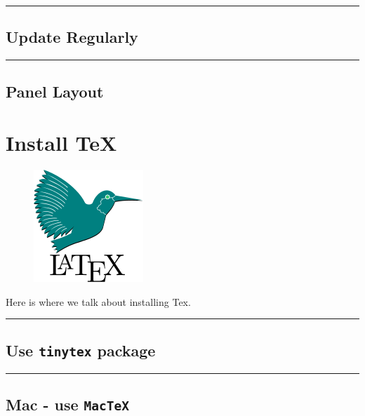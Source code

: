 \documentclass[]{book}
\theoremstyle{definition}
\theoremstyle{definition}
\theoremstyle{definition}
\theoremstyle{remark}
\begin{document}
\begin{center}\rule{0.5\linewidth}{\linethickness}\end{center}

\section{Update Regularly}\label{update-regularly-1}

\begin{center}\rule{0.5\linewidth}{\linethickness}\end{center}

\section{Panel Layout}\label{panel-layout}

\chapter{Install TeX}\label{install-tex}

\begin{figure}
\centering
\includegraphics{img/latex.png}
\caption{}
\end{figure}

Here is where we talk about installing Tex.

\begin{center}\rule{0.5\linewidth}{\linethickness}\end{center}

\section{\texorpdfstring{Use \texttt{tinytex}
package}{Use tinytex package}}\label{use-tinytex-package}

\begin{center}\rule{0.5\linewidth}{\linethickness}\end{center}

\section{\texorpdfstring{Mac - use
\texttt{MacTeX}}{Mac - use MacTeX}}\label{mac---use-mactex}
\end{document}
